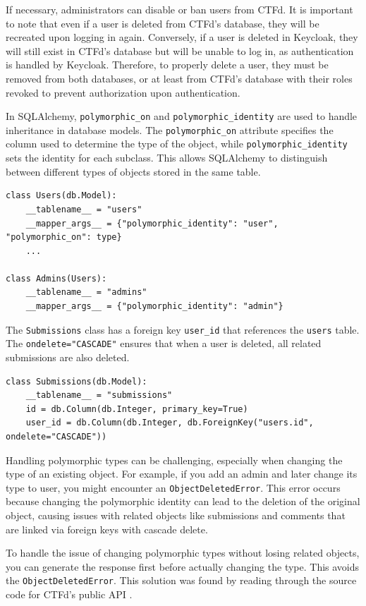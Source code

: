 If necessary, administrators can disable or ban users from CTFd. It is important to note that even if a user is deleted from CTFd's database, they will be recreated upon logging in again. Conversely, if a user is deleted in Keycloak, they will still exist in CTFd's database but will be unable to log in, as authentication is handled by Keycloak. Therefore, to properly delete a user, they must be removed from both databases, or at least from CTFd's database with their roles revoked to prevent authorization upon authentication.

In SQLAlchemy, \texttt{polymorphic\_on} and \texttt{polymorphic\_identity} are used to handle inheritance in database models. The \texttt{polymorphic\_on} attribute specifies the column used to determine the type of the object, while \texttt{polymorphic\_identity} sets the identity for each subclass. This allows SQLAlchemy to distinguish between different types of objects stored in the same table.

\begin{verbatim}
class Users(db.Model):
    __tablename__ = "users"
    __mapper_args__ = {"polymorphic_identity": "user", "polymorphic_on": type}
    ...

class Admins(Users):
    __tablename__ = "admins"
    __mapper_args__ = {"polymorphic_identity": "admin"}
\end{verbatim}

The \texttt{Submissions} class has a foreign key \texttt{user\_id} that references the \texttt{users} table. The \texttt{ondelete="CASCADE"} ensures that when a user is deleted, all related submissions are also deleted.

\begin{verbatim}
class Submissions(db.Model):
    __tablename__ = "submissions"
    id = db.Column(db.Integer, primary_key=True)
    user_id = db.Column(db.Integer, db.ForeignKey("users.id", ondelete="CASCADE"))
\end{verbatim}

Handling polymorphic types can be challenging, especially when changing the type of an existing object. For example, if you add an admin and later change its type to user, you might encounter an \texttt{ObjectDeletedError}. This error occurs because changing the polymorphic identity can lead to the deletion of the original object, causing issues with related objects like submissions and comments that are linked via foreign keys with cascade delete.

To handle the issue of changing polymorphic types without losing related objects, you can generate the response first before actually changing the type. This avoids the \texttt{ObjectDeletedError}. This solution was found by reading through the source code for CTFd's public API \cite{CTFdUsersAPI}.

